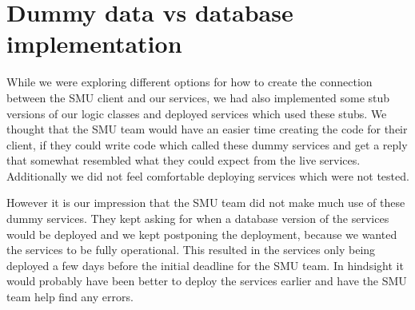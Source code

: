 \documentclass[../report.tex]{subfiles}
\begin{document}
\section{Dummy data vs database implementation}
While we were exploring different options for how to create the connection between the SMU client and our services, we had also implemented some stub versions of our logic classes and deployed services which used these stubs.
We thought that the SMU team would have an easier time creating the code for their client, if they could write code which called these dummy services and get a reply that somewhat resembled what they could expect from the live services.
Additionally we did not feel comfortable deploying services which were not tested.

However it is our impression that the SMU team did not make much use of these dummy services.
They kept asking for when a database version of the services would be deployed and we kept postponing the deployment, because we wanted the services to be fully operational.
This resulted in the services only being deployed a few days before the initial deadline for the SMU team.
In hindsight it would probably have been better to deploy the services earlier and have the SMU team help find any errors.
\end{document}
